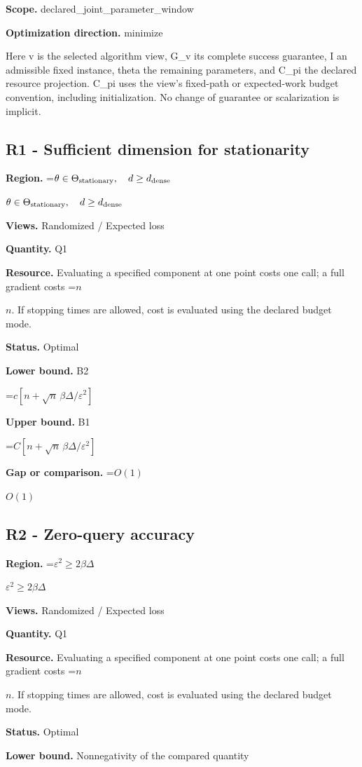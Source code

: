 \documentclass[10pt,a4paper]{article}
\newcommand{\AtlasMath}[1]{\par\begingroup\centering\setbox0=\hbox{$\displaystyle #1$}\ifdim\wd0>1.4\linewidth\typeout{ATLAS WIDE FORMULA: \the\wd0}\fi\ifdim\wd0>\linewidth\resizebox{\linewidth}{!}{\box0}\else\box0\fi\par\endgroup}
\newcommand{\AtlasInlineMath}[1]{\begingroup\setbox0=\hbox{$#1$}\ifdim\wd0>.4\linewidth\endgroup\AtlasMath{#1}\else\endgroup$#1$\fi}
\begin{document}
\textbf{Scope.} declared\_joint\_parameter\_window

\textbf{Optimization direction.} minimize

Here v is the selected algorithm view, G\_v its complete success guarantee, I an admissible fixed instance, theta the remaining parameters, and C\_pi the declared resource projection. C\_pi uses the view's fixed-path or expected-work budget convention, including initialization. No change of guarantee or scalarization is implicit.

\subsection{R1 - Sufficient dimension for stationarity}
\textbf{Region.} \AtlasInlineMath{\theta\in\Theta_{\rm stationary},\quad d\ge d_{\rm dense}}

\textbf{Views.} Randomized / Expected loss

\textbf{Quantity.} Q1

\textbf{Resource.} Evaluating a specified component at one point costs one call; a full gradient costs \AtlasInlineMath{n}. If stopping times are allowed, cost is evaluated using the declared budget mode.

\textbf{Status.} Optimal

\textbf{Lower bound.} B2

\AtlasMath{c[n+\sqrt n\,\beta\Delta/\varepsilon^2]}
\textbf{Upper bound.} B1

\AtlasMath{C[n+\sqrt n\,\beta\Delta/\varepsilon^2]}
\textbf{Gap or comparison.} \AtlasInlineMath{O(1)}

\subsection{R2 - Zero-query accuracy}
\textbf{Region.} \AtlasInlineMath{\varepsilon^2\ge2\beta\Delta}

\textbf{Views.} Randomized / Expected loss

\textbf{Quantity.} Q1

\textbf{Resource.} Evaluating a specified component at one point costs one call; a full gradient costs \AtlasInlineMath{n}. If stopping times are allowed, cost is evaluated using the declared budget mode.

\textbf{Status.} Optimal

\textbf{Lower bound.} Nonnegativity of the compared quantity
\end{document}

